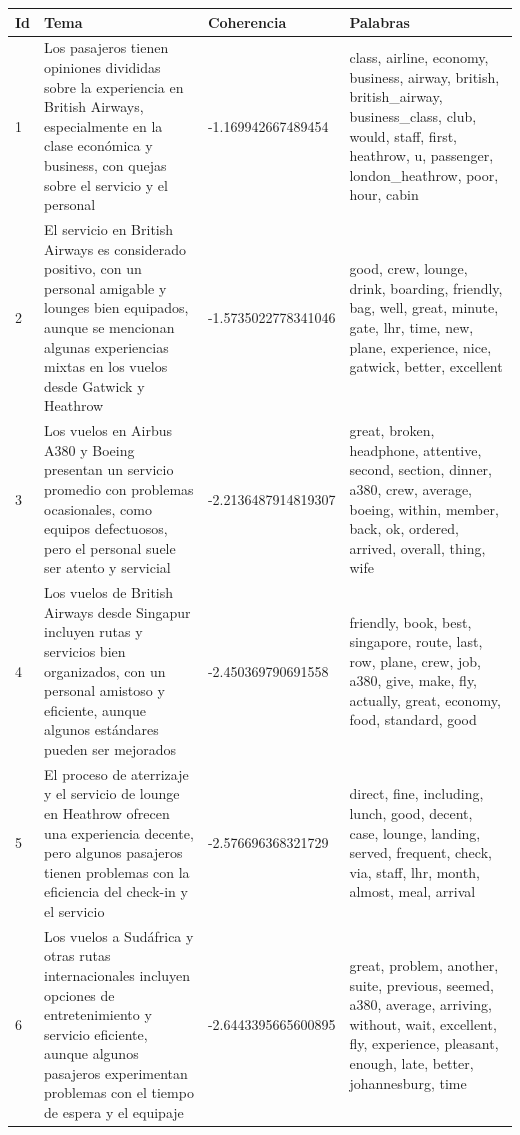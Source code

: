 \documentclass{report}
\begin{document}
{{                \label{tab:temas_british_airline_negativas}
                \begin{longtable}{|p{1cm}|p{4cm}|p{4cm}|p{6cm}|}
                    \hline
                    \textbf{Id} & \textbf{Tema} & \textbf{Coherencia} & \textbf{Palabras} \\
                    \hline
                    1 & Los pasajeros tienen opiniones divididas sobre la experiencia en British Airways, especialmente en la clase económica y business, con quejas sobre el servicio y el personal & -1.169942667489454 & class, airline, economy, business, airway, british, british\_airway, business\_class, club, would, staff, first, heathrow, u, passenger, london\_heathrow, poor, hour, cabin \\
                    \hline
                    2 & El servicio en British Airways es considerado positivo, con un personal amigable y lounges bien equipados, aunque se mencionan algunas experiencias mixtas en los vuelos desde Gatwick y Heathrow & -1.5735022778341046 & good, crew, lounge, drink, boarding, friendly, bag, well, great, minute, gate, lhr, time, new, plane, experience, nice, gatwick, better, excellent \\
                    \hline
                    3 & Los vuelos en Airbus A380 y Boeing presentan un servicio promedio con problemas ocasionales, como equipos defectuosos, pero el personal suele ser atento y servicial & -2.2136487914819307 & great, broken, headphone, attentive, second, section, dinner, a380, crew, average, boeing, within, member, back, ok, ordered, arrived, overall, thing, wife \\
                    \hline
                    4 & Los vuelos de British Airways desde Singapur incluyen rutas y servicios bien organizados, con un personal amistoso y eficiente, aunque algunos estándares pueden ser mejorados & -2.450369790691558 & friendly, book, best, singapore, route, last, row, plane, crew, job, a380, give, make, fly, actually, great, economy, food, standard, good \\
                    \hline
                    5 & El proceso de aterrizaje y el servicio de lounge en Heathrow ofrecen una experiencia decente, pero algunos pasajeros tienen problemas con la eficiencia del check-in y el servicio & -2.576696368321729 & direct, fine, including, lunch, good, decent, case, lounge, landing, served, frequent, check, via, staff, lhr, month, almost, meal, arrival \\
                    \hline
                    6 & Los vuelos a Sudáfrica y otras rutas internacionales incluyen opciones de entretenimiento y servicio eficiente, aunque algunos pasajeros experimentan problemas con el tiempo de espera y el equipaje & -2.6443395665600895 & great, problem, another, suite, previous, seemed, a380, average, arriving, without, wait, excellent, fly, experience, pleasant, enough, late, better, johannesburg, time \\

\end{longtable}}}
\end{document}
